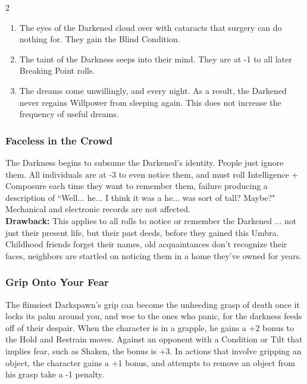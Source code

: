 \begin{multicols}{2}
    \begin{enumerate}
\item The eyes of the Darkened cloud over with cataracts that surgery can do nothing for. They gain the Blind Condition.
\item The taint of the Darkness seeps into their mind. They are at -1 to all later Breaking Point rolls.
\item The dreams come unwillingly, and every night. As a result, the Darkened never regains Willpower from sleeping again. This does not increase the frequency of useful dreams.                                                                                                                         \end{enumerate}

\subsubsection*{Faceless in the Crowd}
The Darkness begins to subsume the Darkened's identity. People just ignore them. All individuals are at -3 to even notice them, and must roll Intelligence + Composure each time they want to remember them, failure producing a description of \textquotedblleft Well... he... I think it was a he... was sort of tall? Maybe?" Mechanical and electronic records are not affected. \\

\noindent \textbf{Drawback:} This applies to all rolls to notice or remember the Darkened ... not just their present life, but their past deeds, before they gained this Umbra. Childhood friends forget their names, old acquaintances don't recognize their faces, neighbors are startled on noticing them in a home they've owned for years. 

\subsubsection*{Grip Onto Your Fear}

The flimsiest Darkspawn’s grip can become the unheeding grasp of death once it locks its palm around you, and woe to the ones who panic, for the darkness feeds off of their despair. When the character is in a grapple, he gains a +2 bonus to the Hold and Restrain moves. Against an opponent with a Condition or Tilt that implies fear, such as Shaken, the bonus is +3. In actions that involve gripping an object, the character gains a +1 bonus, and attempts to remove an object from his grasp take a -1 penalty.


\end{multicols}
